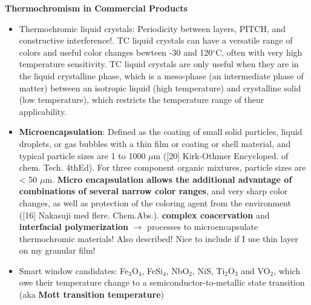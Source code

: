 \newpage
\cite{TCcommercialProducts} 
\textbf{Thermochromism in Commercial Products} \\
\begin{itemize}
\item Thermochromic liquid crystals: Periodicity between layers, PITCH, and constructive interference!. 
   TC liquid crystals can have a versatile range of colors and useful color changes bewteen -30 
   and 120$^{\circ}$C, often with very high temperature sensitivity. TC liquid crystals are only useful when
   they are in the liquid crystalline phase, which is a meso-phase (an intermediate phase of matter) between
   an isotropic liquid (high temperature) and crystalline solid (low temperature), which restricts the
   temperature range of theur applicability.
\item \textbf{Microencapsulation}: Defined as the coating of small solid particles, liquid droplets,
   or gas bubbles with a thin film or coating or shell material, and typical particle sizes are
   1 to 1000 $\mu$m ([20] Kirk-Othmer Encycloped. of chem. Tech. 4thEd). For three component organic mixtures,
   particle sizes are < 50 $\mu$m. \textbf{Micro encapsulation allows the additional advantage 
   of combinations of several narrow color ranges}, and very sharp color changes, 
      as well as protection of the coloring agent
   from the environment ([16] Nakasuji med flere. Chem.Abs.).
   \textbf{complex coacervation} and \textbf{interfacial polymerization} $\rightarrow$ processes to
   microencapsulate thermochromic materials! Also described! Nice to include if I use thin layer on my 
   granular film!
\item Smart window candidates: Fe$_3$O$_4$, FeSi$_4$, NbO$_2$, NiS, Ti$_2$O$_3$ and VO$_2$, which
   owe their temperature change to a semiconductor-to-metallic state transition 
   (aka \textbf{Mott transition temperature})
\end{itemize}



